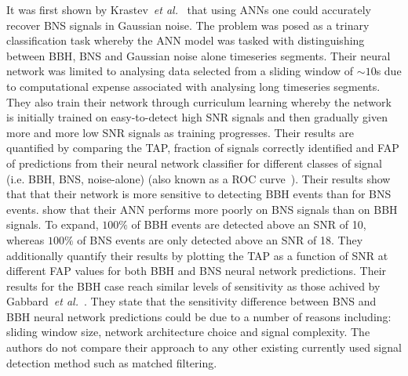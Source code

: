 %
It was first shown by Krastev~\textit{et al.}~\cite{KRASTEV2020135330} 
that using \ac{ANN}s one could accurately recover \ac{BNS} 
signals in Gaussian noise. The problem was posed as a 
trinary classification task whereby the \ac{ANN} model was tasked 
with distinguishing between \ac{BBH}, \ac{BNS} and Gaussian 
noise alone timeseries segments. Their neural network was 
limited to analysing data selected from a sliding window 
of $\sim10$s due to computational expense associated with 
analysing long timeseries segments. They also train their network 
through curriculum learning whereby the network is initially 
trained on easy-to-detect high \ac{SNR} signals and then gradually given 
more and more low \ac{SNR} signals as training progresses. Their results 
are quantified by comparing the \ac{TAP}, fraction of signals correctly 
identified and \ac{FAP} of predictions from their neural network classifier
for different classes of signal (i.e. \ac{BBH}, \ac{BNS}, noise-alone) 
(also known as a \ac{ROC} curve~\cite{everitt2010cambridge}). Their results 
show that that their network is more sensitive to detecting \ac{BBH} 
events than for \ac{BNS} events.
show that their \ac{ANN} 
performs more poorly on \ac{BNS} signals than on 
\ac{BBH} signals. To expand, $100\%$ of \ac{BBH} events 
are detected above an \ac{SNR} of 10, whereas $100\%$ of \ac{BNS} events 
are only detected above an \ac{SNR} of 18. They additionally quantify 
their results by plotting the \ac{TAP} as a function of \ac{SNR} at 
different \ac{FAP} values for both \ac{BBH} and \ac{BNS} neural 
network predictions. Their results for the \ac{BBH} case reach similar levels 
of sensitivity as those achived by 
Gabbard~\textit{et al.}~\cite{PhysRevLett.120.141103}. They state that 
the sensitivity difference between \ac{BNS} and \ac{BBH} neural network 
predictions could be due to a number of reasons including: 
sliding window size, network architecture choice and signal complexity. 
The authors do not compare their approach to any other 
existing currently used signal detection method such as 
matched filtering.

